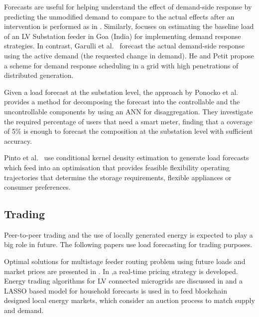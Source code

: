 Forecasts are useful for helping understand the effect of demand-side response by predicting the unmodified demand to compare to the actual effects after an intervention is performed as in \cite{larsen2017dre}. Similarly, \cite{priolkar2020aoc} focuses on estimating the baseline load of an LV Substation feeder in Goa (India) for implementing demand response strategies.  In contrast, Garulli et al.~\cite{garulli2015mat} forecast the actual demand-side response using the active demand (the requested change in demand).  He and Petit \cite{he2019drs} propose a scheme for demand response scheduling in a grid with high penetrations of distributed generation. 

Given a load forecast at the substation level, the approach by Ponocko et al.~\cite{ponocko2018fdf} provides a method for decomposing the forecast into the controllable and the uncontrollable components by using an ANN for disaggregation. They investigate the required percentage of users that need a smart meter, finding that a coverage of 5\% is enough to forecast the composition at the substation level with sufficient accuracy.

Pinto et al.~\cite{pinto2017mpf} use conditional kernel density estimation to generate load forecasts which feed into an optimisation that provides feasible flexibility operating trajectories that determine the storage requirements, flexible appliances or consumer preferences. 



\subsection{Trading}

Peer-to-peer trading and the use of locally generated energy is expected to play a big role in future. The following papers use load forecasting for trading purposes.

Optimal solutions for multistage feeder routing problem using future loads and market prices are presented in \cite{Taghizadegan2019asc}. In  \cite{he2019mop},a real-time pricing strategy is developed. Energy trading algorithms for LV connected microgrids are discussed in \cite{feng2019hae} and a LASSO based model for household forecasts is used in \cite{kostmann2019fib} to feed blockchain designed local energy markets, which consider an auction process to match supply and demand. 


